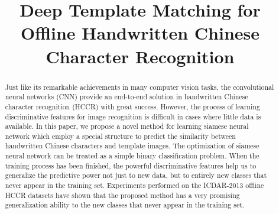 \documentclass[conference]{IEEEtran}
\begin{document}
\title{Deep Template Matching for Offline Handwritten Chinese Character Recognition}


\author{
\and
{}
\and
{}
\and
{}
}










\maketitle

\begin{abstract}
Just like its remarkable achievements in many computer vision tasks, the convolutional neural networks (CNN) provide an end-to-end solution in handwritten Chinese character recognition (HCCR) with great success. However, the process of learning discriminative features for image recognition is difficult in cases where little data is available. In this paper, we propose a novel method for learning siamese neural network which employ a special structure to predict the similarity between handwritten Chinese characters and template images. The optimization of siamese neural network can be treated as a simple binary classification problem. When the training process has been finished, the powerful discriminative features help us to generalize the predictive power not just to new data, but to entirely new classes that never appear in the training set. Experiments performed on the ICDAR-2013 offline HCCR datasets have shown that the proposed method has a very promising generalization ability to the new classes that never appear in the training set.
\end{abstract}





\IEEEpeerreviewmaketitle
\end{document}
